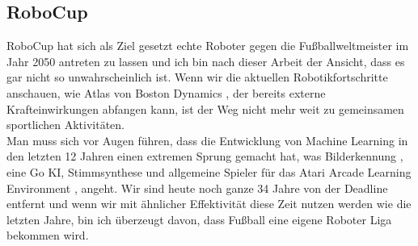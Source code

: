         \subsection*{RoboCup}
            RoboCup hat sich als Ziel gesetzt echte Roboter gegen die Fußballweltmeister im Jahr 2050 antreten zu lassen und ich bin nach dieser Arbeit der Ansicht, dass es gar nicht so unwahrscheinlich ist. Wenn wir die aktuellen Robotikfortschritte anschauen, wie Atlas von Boston Dynamics \cite{robot}, der bereits externe Krafteinwirkungen abfangen kann, ist der Weg nicht mehr weit zu gemeinsamen sportlichen Aktivitäten.\\

            \noindent
            Man muss sich vor Augen führen, dass die Entwicklung von Machine Learning in den letzten 12 Jahren einen extremen Sprung gemacht hat, was Bilderkennung \cite{NIPS2012_4824}, eine Go KI, Stimmsynthese und allgemeine Spieler für das Atari Arcade Learning Environment \cite{Naddaf2010}, angeht. Wir sind heute noch ganze 34 Jahre von der Deadline entfernt und wenn wir mit ähnlicher Effektivität diese Zeit nutzen werden wie die letzten Jahre, bin ich überzeugt davon, dass Fußball eine eigene Roboter Liga bekommen wird.
